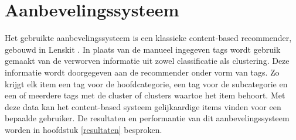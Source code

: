 \section{Aanbevelingssysteem}
Het gebruikte aanbevelingssysteem is een klassieke content-based recommender, gebouwd in Lenskit \cite{Ekstrand2011a}. In plaats van de manueel ingegeven tags wordt gebruik gemaakt van de verworven informatie uit zowel classificatie als clustering. Deze informatie wordt doorgegeven aan de recommender onder vorm van tags. Zo krijgt elk item een tag voor de hoofdcategorie, een tag voor de subcategorie en een of meerdere tags met de cluster of clusters waartoe het item behoort. Met deze data kan het content-based systeem gelijkaardige items vinden voor een bepaalde gebruiker. De resultaten en performantie van dit aanbevelingssysteem worden in hoofdstuk \ref{resultaten} besproken.